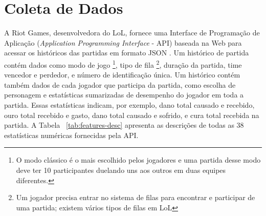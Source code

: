 \section{Coleta de Dados}
A Riot Games, desenvolvedora do LoL, fornece uma Interface de Programação de Aplicação (\textit{Application Programming Interface} - API) baseada na Web para acessar os históricos das partidas em formato JSON \cite{riot1}. Um histórico de partida contém dados como modo de jogo \footnote{O modo clássico é o mais escolhido pelos jogadores e uma partida desse modo deve ter 10 participantes duelando uns aos outros em duas equipes diferentes.}, tipo de fila \footnote{Um jogador precisa entrar no sistema de filas para encontrar e participar de uma partida; existem vários tipos de filas em LoL}, duração da partida, time vencedor e perdedor, e número de identificação única. Um histórico contém também dados de cada jogador que participa da partida, como escolha de personagem e estatísticas sumarizadas de desempenho do jogador em toda a partida. Essas estatísticas indicam, por exemplo, dano total causado e recebido, ouro total recebido e gasto, dano total causado e sofrido, e cura total recebida na partida. A Tabela ~\ref{tab:features-desc} apresenta as descrições de todas as 38 estatísticas numéricas fornecidas pela API.


